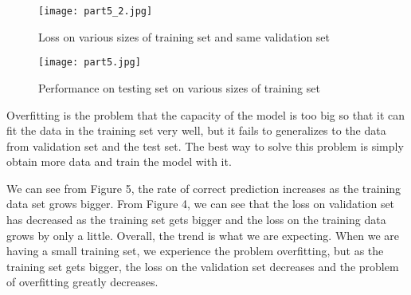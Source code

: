\documentclass{article}
\begin{document}
\begin{part5}
\begin{figure*}[h!]
    \centering
    \texttt{[image: part5\_2.jpg]}
    \caption{Loss on various sizes of training set and same validation set}
    \label{fig:mean_a}
\end{figure*}

\newpage

\vspace{5mm}

\begin{figure*}[h!]
    \centering
    \texttt{[image: part5.jpg]}
    \caption{Performance on testing set on various sizes of training set}
    \label{fig:mean_a}
\end{figure*}

\vspace{5mm}

Overfitting is the problem that the capacity of the model is too big so that it can fit the data in the training set very well, but it fails to generalizes to the data from validation set and the test set. The best way to solve this problem is simply obtain more data and train the model with it.

\vspace{5mm}

We can see from Figure 5, the rate of correct prediction increases as the training data set grows bigger. From Figure 4, we can see that the loss on validation set has decreased as the training set gets bigger and the loss on the training data grows by only a little. Overall, the trend is what we are expecting. When we are having a small training set, we experience the problem overfitting, but as the training set gets bigger, the loss on the validation set decreases and the problem of overfitting greatly decreases.


\end{part5}
\end{document}
